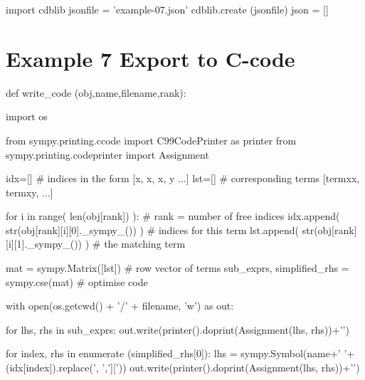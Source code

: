 \documentclass[12pt]{cdblatex}
\begin{document}
\bgroup
{}
\begin{cadabra}
   import cdblib
   jsonfile = 'example-07.json'
   cdblib.create (jsonfile)
   json = []
\end{cadabra}
\egroup

\clearpage

\section*{Example 7 Export to C-code}

\begin{cadabra}
   def write_code (obj,name,filename,rank):

      import os

      from sympy.printing.ccode import C99CodePrinter as printer
      from sympy.printing.codeprinter import Assignment

      idx=[]  # indices in the form [{x, x}, {x, y} ...]
      lst=[]  # corresponding terms [termxx, termxy, ...]

      for i in range( len(obj[rank]) ):                 # rank = number of free indices
          idx.append( str(obj[rank][i][0]._sympy_()) )  # indices for this term
          lst.append( str(obj[rank][i][1]._sympy_()) )  # the matching term

      mat = sympy.Matrix([lst])                         # row vector of terms
      sub_exprs, simplified_rhs = sympy.cse(mat)        # optimise code

      with open(os.getcwd() + '/' + filename, 'w') as out:

         for lhs, rhs in sub_exprs:
            out.write(printer().doprint(Assignment(lhs, rhs))+'\n')

         for index, rhs in enumerate (simplified_rhs[0]):
            lhs = sympy.Symbol(name+' '+(idx[index]).replace(', ',']['))
            out.write(printer().doprint(Assignment(lhs, rhs))+'\n')
\end{cadabra}

\clearpage
\end{document}
